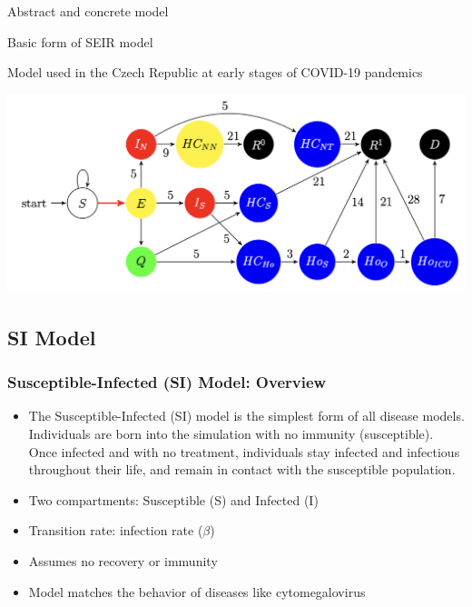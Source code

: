\begin{frame}{Abstract and concrete model}

Basic form of SEIR model

\begin{center}
    
\end{center}

\vfill

Model used in the Czech Republic at early stages of COVID-19 pandemics
  \begin{center}
    \includegraphics[scale = 0.4]{lesson_3/images/model.png}
  \end{center}
\end{frame}

\subsection{SI Model}
\small
\begin{frame}
  \frametitle{Susceptible-Infected (SI) Model: Overview}
  \begin{itemize}
    \item  The  Susceptible-Infected (SI) model is the simplest form of all disease models. Individuals are born into the simulation with no immunity (susceptible). Once infected and with no treatment, individuals stay infected and infectious throughout their life, and remain in contact with the susceptible population.
    \item Two compartments: Susceptible (S) and Infected (I)
    \item Transition rate: infection rate ($\beta$)
    \item Assumes no recovery or immunity
    \item  Model matches the behavior of diseases like cytomegalovirus 
  \end{itemize}
\end{frame}

